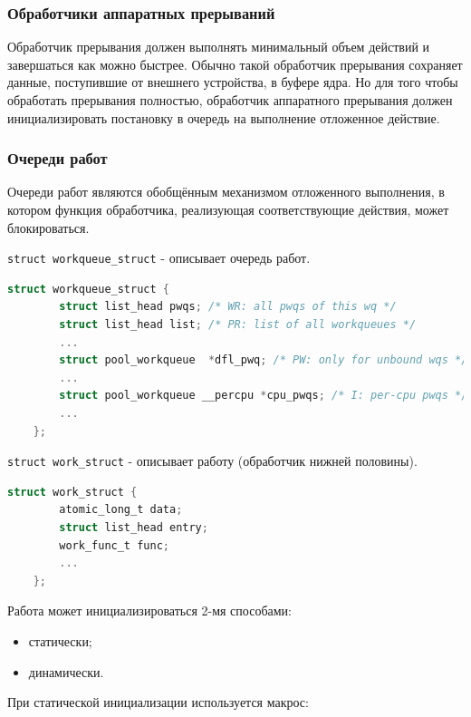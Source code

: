 \subsubsection{Обработчики аппаратных прерываний}

Обработчик прерывания должен выполнять минимальный объем действий и завершаться как можно быстрее. Обычно такой обработчик прерывания сохраняет данные, поступившие от внешнего устройства, в буфере ядра. 
Но для того чтобы обработать прерывания полностью, обработчик аппаратного прерывания должен инициализировать постановку в очередь на выполнение отложенное действие.

\subsubsection{Очереди работ}

Очереди работ являются обобщённым механизмом отложенного выполнения, в котором функция обработчика, реализующая соответствующие действия, может блокироваться.

\texttt{struct workqueue\_struct} - описывает очередь работ.

\begin{lstlisting}[language=c, label=some-code, caption=Структура workqueue\_struct]
	struct workqueue_struct {
		struct list_head pwqs; /* WR: all pwqs of this wq */
		struct list_head list; /* PR: list of all workqueues */
		...
		struct pool_workqueue  *dfl_pwq; /* PW: only for unbound wqs */
		...
		struct pool_workqueue __percpu *cpu_pwqs; /* I: per-cpu pwqs */
		...
	};
\end{lstlisting}

\texttt{struct work\_struct} - описывает работу (обработчик нижней половины).

\begin{lstlisting}[language=c, label=some-code, caption=Структура workqueue\_struct]
	struct work_struct {
		atomic_long_t data;
		struct list_head entry;
		work_func_t func;
		...
	};
\end{lstlisting}

Работа может инициализироваться 2-мя способами:

\begin{itemize}
	\item статически;
	\item динамически.
\end{itemize}

При статической инициализации используется макрос:

